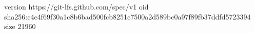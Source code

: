 version https://git-lfs.github.com/spec/v1
oid sha256:c4c4f69f30a1c8b6bad500fcb8251c7500a2d589bc0a97f89fb37ddfd5723394
size 21960
